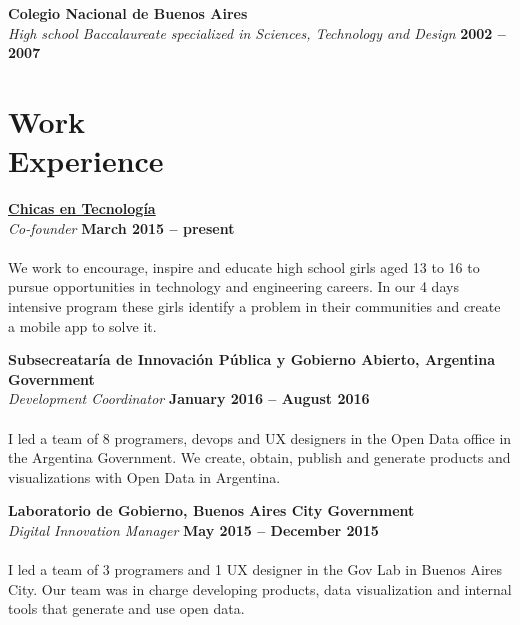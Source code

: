 \documentclass[margin,line]{resume}
\begin{document}
\begin{resume}
\textbf{Colegio Nacional de Buenos Aires} \vspace{2mm}\\\vspace{1mm}
\textsl{High school Baccalaureate specialized in Sciences, Technology and Design} \hfill \textbf{ 2002 -- 2007}\vspace{-3mm}\\\vspace{-1mm}

\section{\mysidestyle Work\\Experience}

\textbf{\href{http://www.chicasentecnologia.org/}{Chicas en Tecnolog\'ia}}\\\vspace{1mm}
\textsl{Co-founder} \hfill \textbf{March 2015 -- present}\vspace{-3mm}\\\vspace{-1mm}
\\
We work to encourage, inspire and educate high school girls aged 13 to 16 to pursue opportunities in technology and engineering careers.  In our 4 days intensive program these girls identify a problem in their communities and create a mobile app to solve it.

\textbf{Subsecreatar\'ia de Innovaci\'on P\'ublica y Gobierno Abierto, Argentina Government}\vspace{2mm}\\\vspace{1mm}
\textsl{Development Coordinator} \hfill \textbf{January 2016 -- August 2016}\vspace{-3mm}\\\vspace{-1mm}
\\
I led a team of 8 programers, devops and UX designers in the Open Data office in the Argentina Government. We create, obtain, publish and generate products and visualizations with Open Data in Argentina.

\textbf{Laboratorio de Gobierno, Buenos Aires City Government}\vspace{2mm}\\\vspace{1mm}
\textsl{Digital Innovation Manager} \hfill \textbf{May 2015 -- December 2015}\vspace{-3mm}\\\vspace{-1mm}
\\
I led a team of 3 programers and 1 UX designer in the Gov Lab in Buenos Aires City. Our team was in charge developing products, data visualization and internal tools that generate and use open data.



\end{resume}
\end{document}
